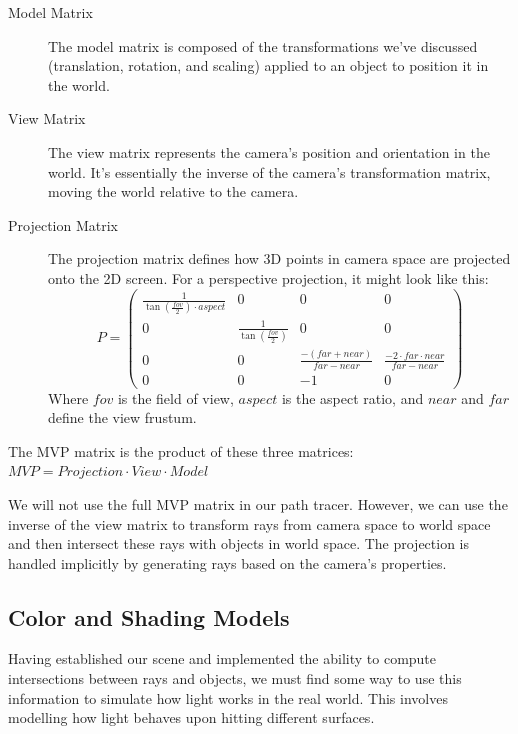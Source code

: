 \documentclass[12pt]{article}
\begin{document}
\begin{description}
    \item[Model Matrix] The model matrix is composed of the transformations we've discussed (translation, rotation, and scaling) applied to an object to position it in the world.

    \item[View Matrix] The view matrix represents the camera's position and orientation in the world. It's essentially the inverse of the camera's transformation matrix, moving the world relative to the camera.

    \item[Projection Matrix] The projection matrix defines how 3D points in camera space are projected onto the 2D screen. For a perspective projection, it might look like this:
          \[
              P = \begin{pmatrix}
                  \frac{1}{\tan(\frac{fov}{2}) \cdot aspect} & 0                             & 0                                & 0                                          \\
                  0                                          & \frac{1}{\tan(\frac{fov}{2})} & 0                                & 0                                          \\
                  0                                          & 0                             & \frac{-(far + near)}{far - near} & \frac{-2 \cdot far \cdot near}{far - near} \\
                  0                                          & 0                             & -1                               & 0
              \end{pmatrix}
          \]
          Where $fov$ is the field of view, $aspect$ is the aspect ratio, and $near$ and $far$ define the view frustum.

\end{description}

The MVP matrix is the product of these three matrices:
$MVP = Projection \cdot View \cdot Model $

We will not use the full MVP matrix in our path tracer. However, we can use the inverse of the view matrix to transform rays from camera space to world space and then intersect these rays with objects in world space. The projection is handled implicitly by generating rays based on the camera's properties.

\subsection{Color and Shading Models}
\label{color_shading}
Having established our scene and implemented the ability to compute intersections between rays and objects, we must find some way to use this information to simulate how light works in the real world. This involves modelling how light behaves upon hitting different surfaces.
\end{document}
